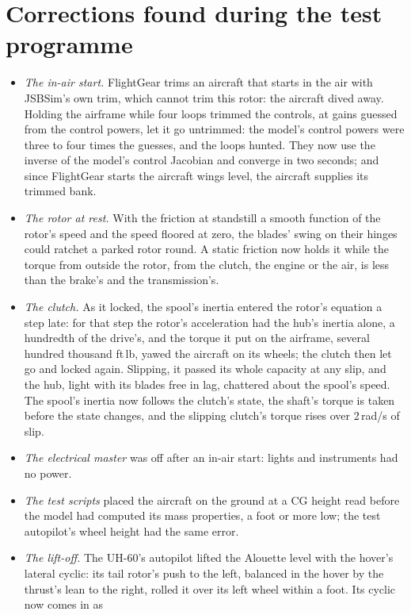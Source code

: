 \documentclass[10pt,a4paper,twocolumn]{article}
\begin{document}
\section{Corrections found during the test programme}\label{sec:review}
\begin{itemize}
\item \emph{The in-air start.} FlightGear trims an aircraft that starts in the air with JSBSim's own trim, which cannot trim this rotor:
the aircraft dived away. Holding the airframe while four loops trimmed the controls, at gains guessed from the control powers, let it go
untrimmed: the model's control powers were three to four times the guesses, and the loops hunted. They now use the inverse of the
model's control Jacobian and converge in two seconds; and since FlightGear starts the aircraft wings level, the aircraft supplies its
trimmed bank.
\item \emph{The rotor at rest.} With the friction at standstill a smooth function of the rotor's speed and the speed floored at zero, the
blades' swing on their hinges could ratchet a parked rotor round. A static friction now holds it while the torque from outside the
rotor, from the clutch, the engine or the air, is less than the brake's and the transmission's.
\item \emph{The clutch.} As it locked, the spool's inertia entered the rotor's equation a step late: for that step the rotor's
acceleration had the hub's inertia alone, a hundredth of the drive's, and the torque it put on the airframe, several hundred thousand
ft\,lb, yawed the aircraft on its wheels; the clutch then let go and locked again. Slipping, it passed its whole capacity at any slip,
and the hub, light with its blades free in lag, chattered about the spool's speed. The spool's inertia now follows the clutch's state,
the shaft's torque is taken before the state changes, and the slipping clutch's torque rises over 2\,rad/s of slip.
\item \emph{The electrical master} was off after an in-air start: lights and instruments had no power.
\item \emph{The test scripts} placed the aircraft on the ground at a CG height read before the model had computed its mass properties,
a foot or more low; the test autopilot's wheel height had the same error.
\item \emph{The lift-off.} The UH-60's autopilot lifted the Alouette level with the hover's lateral cyclic: its tail rotor's push to the
left, balanced in the hover by the thrust's lean to the right, rolled it over its left wheel within a foot. Its cyclic now comes in as

\end{itemize}
\end{document}
